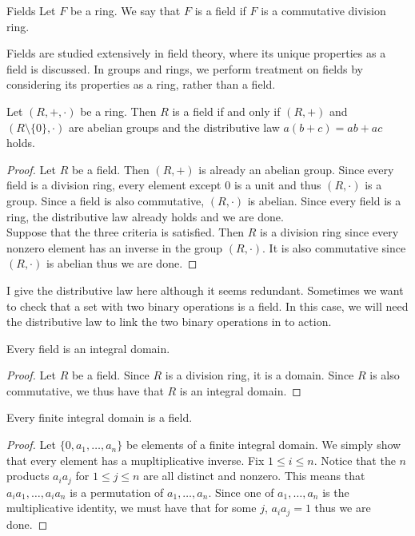 \documentclass[a4paper]{article}
\begin{document}
\begin{defn}{Fields}{} Let $F$ be a ring. We say that $F$ is a field if $F$ is a commutative division ring. 
\end{defn}

Fields are studied extensively in field theory, where its unique properties as a field is discussed. In groups and rings, we perform treatment on fields by considering its properties as a ring, rather than a field. 

\begin{prp}{}{} Let $(R,+,\cdot)$ be a ring. Then $R$ is a field if and only if $(R,+)$ and $(R\setminus\{0\},\cdot)$ are abelian groups and the distributive law $a(b+c)=ab+ac$ holds. 
\begin{proof}
Let $R$ be a field. Then $(R,+)$ is already an abelian group. Since every field is a division ring, every element except $0$ is a unit and thus $(R,\cdot)$ is a group. Since a field is also commutative, $(R,\cdot)$ is abelian. Since every field is a ring, the distributive law already holds and we are done. \\
Suppose that the three criteria is satisfied. Then $R$ is a division ring since every nonzero element has an inverse in the group $(R,\cdot)$. It is also commutative since $(R,\cdot)$ is abelian thus we are done. 
\end{proof}
\end{prp}

I give the distributive law here although it seems redundant. Sometimes we want to check that a set with two binary operations is a field. In this case, we will need the distributive law to link the two binary operations in to action. 

\begin{prp}{}{} Every field is an integral domain. 
\begin{proof}
Let $R$ be a field. Since $R$ is a division ring, it is a domain. Since $R$ is also commutative, we thus have that $R$ is an integral domain. 
\end{proof}
\end{prp}

\begin{prp}{}{} Every finite integral domain is a field. 
\begin{proof}
Let $\{0,a_1,\dots,a_n\}$ be elements of a finite integral domain. We simply show that every element has a mupltiplicative inverse. Fix $1\leq i\leq n$. Notice that the $n$ products $a_ia_j$ for $1\leq j\leq n$ are all distinct and nonzero. This means that $a_ia_1,\dots,a_ia_n$ is a permutation of $a_1,\dots,a_n$. Since one of $a_1,\dots,a_n$ is the multiplicative identity, we must have that for some $j$, $a_ia_j=1$ thus we are done. 
\end{proof}
\end{prp}
\end{document}
